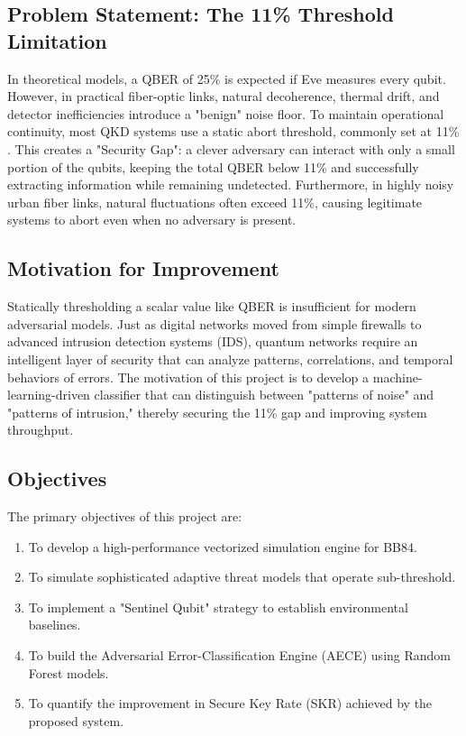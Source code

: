 \documentclass[journal,onecolumn,12pt,draftclsnofoot]{IEEEtran}
\begin{document}
\subsection{Problem Statement: The 11\% Threshold Limitation}
In theoretical models, a QBER of 25\% is expected if Eve measures every qubit. However, in practical fiber-optic links, natural decoherence, thermal drift, and detector inefficiencies introduce a "benign" noise floor. To maintain operational continuity, most QKD systems use a static abort threshold, commonly set at 11\% \cite{sifted_error}. This creates a "Security Gap": a clever adversary can interact with only a small portion of the qubits, keeping the total QBER below 11\% and successfully extracting information while remaining undetected. Furthermore, in highly noisy urban fiber links, natural fluctuations often exceed 11\%, causing legitimate systems to abort even when no adversary is present.

\subsection{Motivation for Improvement}
Statically thresholding a scalar value like QBER is insufficient for modern adversarial models. Just as digital networks moved from simple firewalls to advanced intrusion detection systems (IDS), quantum networks require an intelligent layer of security that can analyze patterns, correlations, and temporal behaviors of errors. The motivation of this project is to develop a machine-learning-driven classifier that can distinguish between "patterns of noise" and "patterns of intrusion," thereby securing the 11\% gap and improving system throughput.

\subsection{Objectives}
The primary objectives of this project are:
\begin{enumerate}
    \item To develop a high-performance vectorized simulation engine for BB84.
    \item To simulate sophisticated adaptive threat models that operate sub-threshold.
    \item To implement a "Sentinel Qubit" strategy to establish environmental baselines.
    \item To build the Adversarial Error-Classification Engine (AECE) using Random Forest models.
    \item To quantify the improvement in Secure Key Rate (SKR) achieved by the proposed system.
\end{enumerate}
\end{document}
